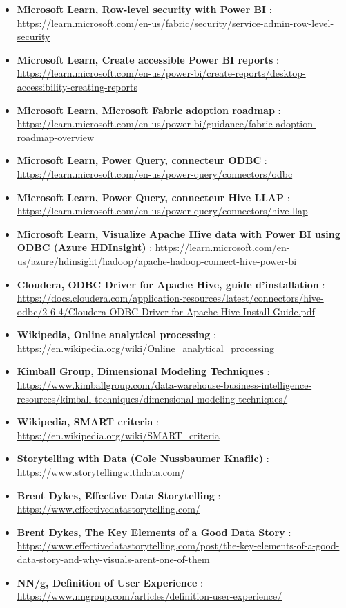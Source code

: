 {\begin{itemize}
	\item \textbf{Microsoft Learn, Row-level security with Power BI} : \url{https://learn.microsoft.com/en-us/fabric/security/service-admin-row-level-security}
	\item \textbf{Microsoft Learn, Create accessible Power BI reports} : \url{https://learn.microsoft.com/en-us/power-bi/create-reports/desktop-accessibility-creating-reports}
	\item \textbf{Microsoft Learn, Microsoft Fabric adoption roadmap} : \url{https://learn.microsoft.com/en-us/power-bi/guidance/fabric-adoption-roadmap-overview}
	\item \textbf{Microsoft Learn, Power Query, connecteur ODBC} : \url{https://learn.microsoft.com/en-us/power-query/connectors/odbc}
	\item \textbf{Microsoft Learn, Power Query, connecteur Hive LLAP} : \url{https://learn.microsoft.com/en-us/power-query/connectors/hive-llap}
	\item \textbf{Microsoft Learn, Visualize Apache Hive data with Power BI using ODBC (Azure HDInsight)} : \url{https://learn.microsoft.com/en-us/azure/hdinsight/hadoop/apache-hadoop-connect-hive-power-bi}
	\item \textbf{Cloudera, ODBC Driver for Apache Hive, guide d'installation} : \url{https://docs.cloudera.com/application-resources/latest/connectors/hive-odbc/2-6-4/Cloudera-ODBC-Driver-for-Apache-Hive-Install-Guide.pdf}
	\item \textbf{Wikipedia, Online analytical processing} : \url{https://en.wikipedia.org/wiki/Online_analytical_processing}
	\item \textbf{Kimball Group, Dimensional Modeling Techniques} : \url{https://www.kimballgroup.com/data-warehouse-business-intelligence-resources/kimball-techniques/dimensional-modeling-techniques/}
	\item \textbf{Wikipedia, SMART criteria} : \url{https://en.wikipedia.org/wiki/SMART_criteria}
	\item \textbf{Storytelling with Data (Cole Nussbaumer Knaflic)} : \url{https://www.storytellingwithdata.com/}
	\item \textbf{Brent Dykes, Effective Data Storytelling} : \url{https://www.effectivedatastorytelling.com/}
	\item \textbf{Brent Dykes, The Key Elements of a Good Data Story} : \url{https://www.effectivedatastorytelling.com/post/the-key-elements-of-a-good-data-story-and-why-visuals-arent-one-of-them}
	\item \textbf{NN/g, Definition of User Experience} : \url{https://www.nngroup.com/articles/definition-user-experience/}

\end{itemize}}
